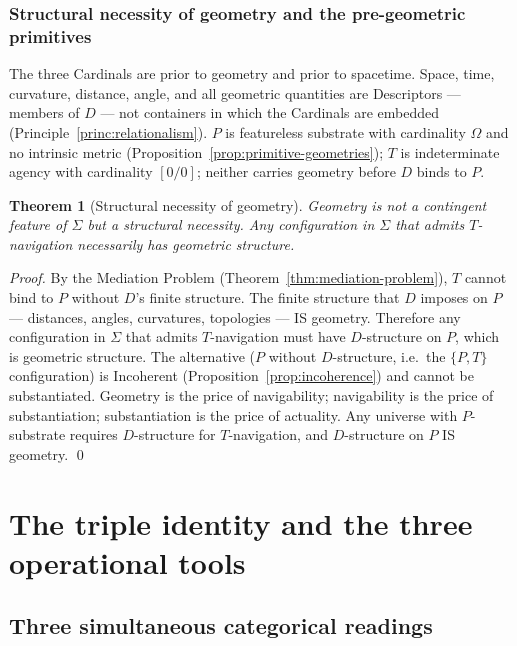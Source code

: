 \documentclass[11pt,a4paper]{article}
\newtheorem{theorem}{Theorem}[section]
\theoremstyle{definition}
\theoremstyle{remark}
\begin{document}
\subsubsection{Structural necessity of geometry and the pre-geometric primitives}\label{subsubsec:geometry-necessary}

The three Cardinals are prior to geometry and prior to spacetime. Space, time, curvature, distance, angle, and all geometric quantities are Descriptors --- members of $D$ --- not containers in which the Cardinals are embedded (Principle~\ref{princ:relationalism}). $P$ is featureless substrate with cardinality $\Omega$ and no intrinsic metric (Proposition~\ref{prop:primitive-geometries}); $T$ is indeterminate agency with cardinality $[0/0]$; neither carries geometry before $D$ binds to $P$.

\begin{theorem}[Structural necessity of geometry]\label{thm:geometry-necessary}
Geometry is not a contingent feature of $\Sigma$ but a structural necessity. Any configuration in $\Sigma$ that admits $T$-navigation necessarily has geometric structure.
\end{theorem}

\begin{proof}
By the Mediation Problem (Theorem~\ref{thm:mediation-problem}), $T$ cannot bind to $P$ without $D$'s finite structure. The finite structure that $D$ imposes on $P$ --- distances, angles, curvatures, topologies --- IS geometry. Therefore any configuration in $\Sigma$ that admits $T$-navigation must have $D$-structure on $P$, which is geometric structure. The alternative ($P$ without $D$-structure, i.e.\ the $\{P,T\}$ configuration) is Incoherent (Proposition~\ref{prop:incoherence}) and cannot be substantiated. Geometry is the price of navigability; navigability is the price of substantiation; substantiation is the price of actuality. Any universe with $P$-substrate requires $D$-structure for $T$-navigation, and $D$-structure on $P$ IS geometry. \qed
\end{proof}

\section{The triple identity and the three operational tools}\label{sec:triads}

\subsection{Three simultaneous categorical readings}
\end{document}
